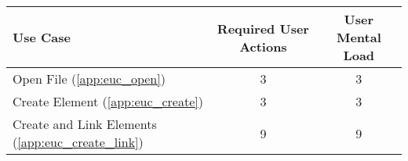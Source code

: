 


\begin{tabularx}{\textwidth}{Xcc}
\textbf{Use Case} & \textbf{Required User Actions} & \textbf{User Mental Load}\\
\hline
Open File (\ref{app:euc_open})                       & 3 & 3 \\
Create Element (\ref{app:euc_create})                & 3 & 3 \\
Create and Link Elements (\ref{app:euc_create_link}) & 9 & 9
\end{tabularx}
